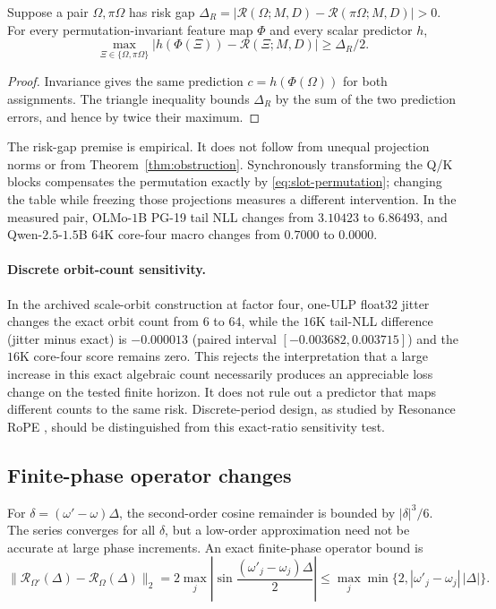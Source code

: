 \begin{proposition}
\label{thm:non-identifiability-appendix}
Suppose a pair $\Omega,\pi\Omega$ has risk gap
$\Delta_R=|\mathcal R(\Omega;M,D)-\mathcal R(\pi\Omega;M,D)|>0$.
For every permutation-invariant feature map $\Phi$ and every scalar predictor $h$,
\[
\max_{\Xi\in\{\Omega,\pi\Omega\}}
|h(\Phi(\Xi))-\mathcal R(\Xi;M,D)|\ge\Delta_R/2.
\]
\end{proposition}
\begin{proof}
Invariance gives the same prediction $c=h(\Phi(\Omega))$ for both assignments. The triangle inequality bounds $\Delta_R$ by the sum of the two prediction errors, and hence by twice their maximum.
\end{proof}
The risk-gap premise is empirical. It does not follow from unequal projection norms or from Theorem~\ref{thm:obstruction}. Synchronously transforming the Q/K blocks compensates the permutation exactly by \eqref{eq:slot-permutation}; changing the table while freezing those projections measures a different intervention. In the measured pair, OLMo-$1$B PG-19 tail NLL changes from $3.10423$ to $6.86493$, and Qwen-$2.5$-$1.5$B $64$K core-four macro changes from $0.7000$ to $0.0000$.

\paragraph{Discrete orbit-count sensitivity.}
In the archived scale-orbit construction at factor four, one-ULP float32 jitter changes the exact orbit count from $6$ to $64$, while the $16$K tail-NLL difference (jitter minus exact) is $-0.000013$ (paired interval $[-0.003682,0.003715]$) and the $16$K core-four score remains zero. This rejects the interpretation that a large increase in this exact algebraic count necessarily produces an appreciable loss change on the tested finite horizon. It does not rule out a predictor that maps different counts to the same risk. Discrete-period design, as studied by Resonance RoPE \citep{wang2024resonance}, should be distinguished from this exact-ratio sensitivity test.

\subsection{Finite-phase operator changes}
\label{sec:taylor-breakdown-observables}

For $\delta=(\omega'-\omega)\Delta$, the second-order cosine remainder is bounded by $|\delta|^3/6$. The series converges for all $\delta$, but a low-order approximation need not be accurate at large phase increments. An exact finite-phase operator bound is
\begin{equation}
\|\mathcal R_{\Omega'}(\Delta)-\mathcal R_\Omega(\Delta)\|_2
=2\max_j\left|\sin\frac{(\omega'_j-\omega_j)\Delta}{2}\right|
\le\max_j\min\{2,|\omega'_j-\omega_j|\,|\Delta|\}.
\label{eq:finite-phase-replay-bound}
\end{equation}
\FloatBarrier

